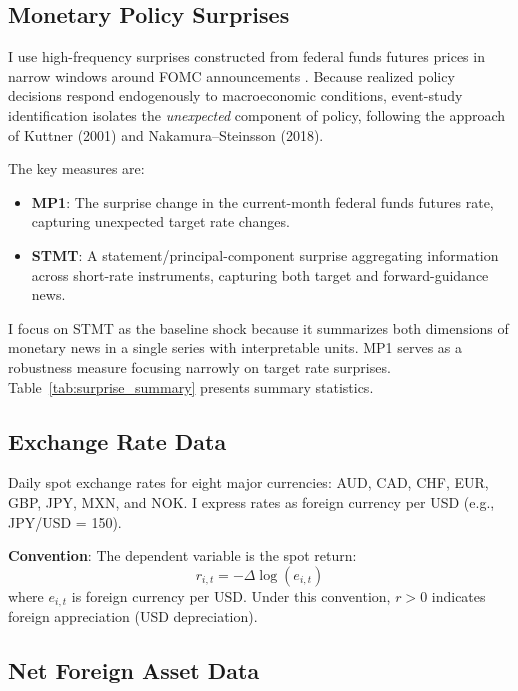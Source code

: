 \documentclass[12pt]{article}
\begin{document}
\subsection{Monetary Policy Surprises}

I use high-frequency surprises constructed from federal funds futures prices in narrow windows around FOMC announcements \citep{bauer2023reassessment}. Because realized policy decisions respond endogenously to macroeconomic conditions, event-study identification isolates the \textit{unexpected} component of policy, following the approach of Kuttner (2001) and Nakamura--Steinsson (2018).

The key measures are:
\begin{itemize}
    \item \textbf{MP1}: The surprise change in the current-month federal funds futures rate, capturing unexpected target rate changes.
    \item \textbf{STMT}: A statement/principal-component surprise aggregating information across short-rate instruments, capturing both target and forward-guidance news.
\end{itemize}

I focus on STMT as the baseline shock because it summarizes both dimensions of monetary news in a single series with interpretable units. MP1 serves as a robustness measure focusing narrowly on target rate surprises. Table~\ref{tab:surprise_summary} presents summary statistics.

\subsection{Exchange Rate Data}

Daily spot exchange rates for eight major currencies: AUD, CAD, CHF, EUR, GBP, JPY, MXN, and NOK. I express rates as foreign currency per USD (e.g., JPY/USD = 150).

\textbf{Convention}: The dependent variable is the spot return:
\begin{equation}
r_{i,t} = -\Delta\log(e_{i,t})
\end{equation}
where $e_{i,t}$ is foreign currency per USD. Under this convention, $r > 0$ indicates foreign appreciation (USD depreciation).

\subsection{Net Foreign Asset Data}
\end{document}
